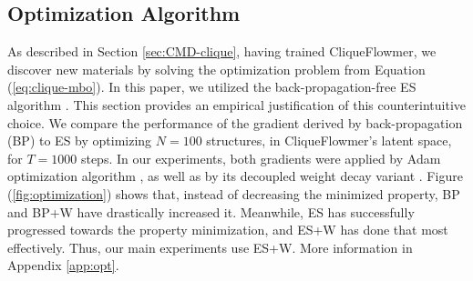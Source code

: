 \documentclass{article}
\theoremstyle{plain}
\theoremstyle{definition}
\theoremstyle{remark}
\begin{document}
\subsection{Optimization Algorithm}
\label{subsec:opt}
\vspace{-5pt}
As described in Section \ref{sec:CMD-clique}, having trained CliqueFlowmer, we discover new materials by solving the optimization problem from Equation (\ref{eq:clique-mbo}).
In this paper, we utilized the back-propagation-free ES algorithm \citep{salimans2017evolution}. 
This section provides an empirical justification of this counterintuitive choice.
We compare the performance of the gradient derived by back-propagation (BP) to ES by optimizing $N=100$ structures, in CliqueFlowmer's latent space, for $T=1000$ steps.
In our experiments, both gradients were applied by Adam optimization algorithm \citep{kingma2014adam}, as well as by its decoupled weight decay variant \citep[BP+W, ES+W]{loshchilov2017fixing}.
Figure (\ref{fig:optimization}) shows that, instead of decreasing the minimized property, BP and BP+W have drastically increased it. 
Meanwhile, ES has successfully progressed towards the property minimization, and ES+W has done that most effectively.
Thus, our main experiments use ES+W.
More information in Appendix \ref{app:opt}.
\end{document}
